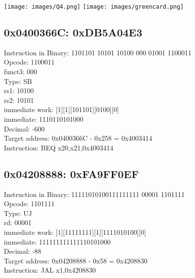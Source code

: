 \documentclass{article}
\begin{document}
\begin{center}
    \texttt{[image: images/Q4.png]}
    \texttt{[image: images/greencard.png]}
\end{center}

\subsection*{0x0400366C: 0xDB5A04E3}

Instruction in Binary: 1101101 10101 10100 000 01001 1100011\\
Opcode: 1100011\\
funct3: 000\\
Type: SB\\
rs1: 10100\\
rs2: 10101\\
immediate work: [1][1][101101][0100][0]\\
immediate: 1110110101000\\
Decimal: -600\\
Target address: 0x0400366C - 0x258 = 0x4003414\\
Instruction: BEQ x20,x21,0x4003414\\

\subsection*{0x04208888: 0xFA9FF0EF}

Instruction in Binary: 11111010100111111111 00001 1101111\\
Opcode: 1101111\\
Type: UJ\\
rd: 00001\\
immediate work: [1][11111111][1][1111010100][0]\\
immediate: 111111111111110101000\\
Decimal: -88\\
Target address: 0x04208888 - 0x58 = 0x4208830\\
Instruction: JAL x1,0x4208830\\
\end{document}
